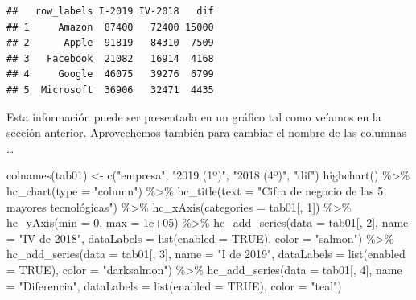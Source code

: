 \documentclass[
]{book}
\newenvironment{Shaded}{\begin{snugshade}}{\end{snugshade}}
\newcommand{\AttributeTok}[1]{\textcolor[rgb]{0.77,0.63,0.00}{#1}}
\newcommand{\ConstantTok}[1]{\textcolor[rgb]{0.00,0.00,0.00}{#1}}
\newcommand{\DecValTok}[1]{\textcolor[rgb]{0.00,0.00,0.81}{#1}}
\newcommand{\FloatTok}[1]{\textcolor[rgb]{0.00,0.00,0.81}{#1}}
\newcommand{\FunctionTok}[1]{\textcolor[rgb]{0.00,0.00,0.00}{#1}}
\newcommand{\NormalTok}[1]{#1}
\newcommand{\OtherTok}[1]{\textcolor[rgb]{0.56,0.35,0.01}{#1}}
\newcommand{\SpecialCharTok}[1]{\textcolor[rgb]{0.00,0.00,0.00}{#1}}
\newcommand{\StringTok}[1]{\textcolor[rgb]{0.31,0.60,0.02}{#1}}
\begin{document}
\begin{Shaded}
\end{Shaded}

\begin{verbatim}
##   row_labels I-2019 IV-2018   dif
## 1     Amazon  87400   72400 15000
## 2      Apple  91819   84310  7509
## 3   Facebook  21082   16914  4168
## 4     Google  46075   39276  6799
## 5  Microsoft  36906   32471  4435
\end{verbatim}

Esta información puede ser presentada en un gráfico tal como veíamos en la sección anterior. Aprovechemos también para cambiar el nombre de las columnas \ldots{}

\begin{Shaded}
\begin{Highlighting}[]
\FunctionTok{colnames}\NormalTok{(tab01) }\OtherTok{\textless{}{-}} \FunctionTok{c}\NormalTok{(}\StringTok{"empresa"}\NormalTok{, }\StringTok{"2019 (1º)"}\NormalTok{, }\StringTok{"2018 (4º)"}\NormalTok{, }
  \StringTok{"dif"}\NormalTok{)}
\FunctionTok{highchart}\NormalTok{() }\SpecialCharTok{\%\textgreater{}\%} \FunctionTok{hc\_chart}\NormalTok{(}\AttributeTok{type =} \StringTok{"column"}\NormalTok{) }\SpecialCharTok{\%\textgreater{}\%} \FunctionTok{hc\_title}\NormalTok{(}\AttributeTok{text =} \StringTok{"Cifra de negocio de las 5 mayores tecnológicas"}\NormalTok{) }\SpecialCharTok{\%\textgreater{}\%} 
  \FunctionTok{hc\_xAxis}\NormalTok{(}\AttributeTok{categories =}\NormalTok{ tab01[, }\DecValTok{1}\NormalTok{]) }\SpecialCharTok{\%\textgreater{}\%} \FunctionTok{hc\_yAxis}\NormalTok{(}\AttributeTok{min =} \DecValTok{0}\NormalTok{, }
  \AttributeTok{max =} \FloatTok{1e+05}\NormalTok{) }\SpecialCharTok{\%\textgreater{}\%} \FunctionTok{hc\_add\_series}\NormalTok{(}\AttributeTok{data =}\NormalTok{ tab01[, }\DecValTok{2}\NormalTok{], }\AttributeTok{name =} \StringTok{"IV de 2018"}\NormalTok{, }
  \AttributeTok{dataLabels =} \FunctionTok{list}\NormalTok{(}\AttributeTok{enabled =} \ConstantTok{TRUE}\NormalTok{), }\AttributeTok{color =} \StringTok{"salmon"}\NormalTok{) }\SpecialCharTok{\%\textgreater{}\%} 
  \FunctionTok{hc\_add\_series}\NormalTok{(}\AttributeTok{data =}\NormalTok{ tab01[, }\DecValTok{3}\NormalTok{], }\AttributeTok{name =} \StringTok{"I de 2019"}\NormalTok{, }
    \AttributeTok{dataLabels =} \FunctionTok{list}\NormalTok{(}\AttributeTok{enabled =} \ConstantTok{TRUE}\NormalTok{), }\AttributeTok{color =} \StringTok{"darksalmon"}\NormalTok{) }\SpecialCharTok{\%\textgreater{}\%} 
  \FunctionTok{hc\_add\_series}\NormalTok{(}\AttributeTok{data =}\NormalTok{ tab01[, }\DecValTok{4}\NormalTok{], }\AttributeTok{name =} \StringTok{"Diferencia"}\NormalTok{, }
    \AttributeTok{dataLabels =} \FunctionTok{list}\NormalTok{(}\AttributeTok{enabled =} \ConstantTok{TRUE}\NormalTok{), }\AttributeTok{color =} \StringTok{"teal"}\NormalTok{)}
\end{Highlighting}
\end{Shaded}
\end{document}
